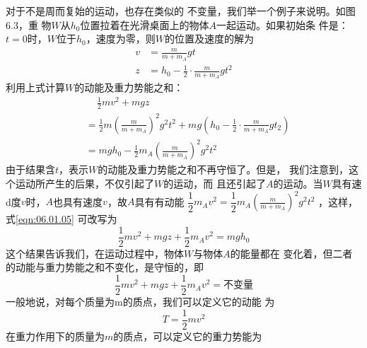 对于不是周而复始的运动，也存在类似的
不变量，我们举一个例子来说明。如图6.3，重
物$ W $从$ h _ { 0 } $位置拉着在光滑桌面上的物体$ A $一起运动。如果初始条
件是：$ t = 0 $时，$ W $位于$ h _ { 0 } $，速度为零，则$ W $的位置及速度的解为
\begin{equation*}
 \begin{aligned}
 v &= \frac { m } { m + m _ { A } } g t \\
 z &= h _ { 0 } - \frac { 1 } { 2 } \cdot \frac { m } { m + m _ { A } } g t ^ { 2 }
 \end{aligned}
\end{equation*}
利用上式计算$ W $的动能及重力势能之和：
{\setlength{\mathindent}{2em}
\begin{equation}\label{eqn:06.01.05}
 \begin{aligned}
 &\quad \, \frac { 1 } { 2 } m v ^ { 2 } + m g z \\
 &= \frac { 1 } { 2 } m \left( \frac { m } { m + m _ { A } } \right) ^ { 2 } g ^ { 2 } t ^ { 2 } + m g \left( h _ { 0 } - \frac { 1 } { 2 } \cdot \frac { m } { m + m _ { A } } g t _ { 2 } \right) \\
 &= m g h _ { 0 } - \frac { 1 } { 2 } m _ { A } \left( \frac { m } { m + m _ { A } } \right) ^ { 2 } g ^ { 2 } t ^ { 2 }
 \end{aligned}
\end{equation}}
由于结果含$ t $，表示$ W $的动能及重力势能之和不再守恒了。但是，
我们注意到，这个运动所产生的后果，不仅引起了$ W $的运动，而
且还引起了$ A $的运动。当$ W $具有速d度$ v $时，$ A $也具有速度$ v $，故$ A $具有有动能
$ \dfrac { 1 } { 2 } m _ { A } v ^ { 2 } = \dfrac { 1 } { 2 } m _ { A } \left( \frac { m } { m + m _ { A } } \right) ^ { 2 } g ^ { 2 } t ^ { 2 } $
，这样，式\eqref{eqn:06.01.05}
可改写为
\begin{equation*}
 \frac { 1 } { 2 } m v ^ { 2 } + m g z + \frac { 1 } { 2 } m _ { A } v ^ { 2 } = m g h _ { 0 }
\end{equation*}
这个结果告诉我们，在运动过程中，物体$ W $与物体$ A $的能量都在
变化着，但二者的动能与重力势能之和不变化，是守恒的，即
\begin{equation}\label{eqn:06.01.06}
 \frac { 1 } { 2 } m v ^ { 2 } + m g z + \frac { 1 } { 2 } m _ { A } v ^ { 2 } = \text{不变量}
\end{equation}
一般地说，对每个质量为m的质点，我们可以定义它的动能
为
\begin{equation*}
 T = \frac { 1 } { 2 } m v ^ { 2 }
\end{equation*}
在重力作用下的质量为$ m $的质点，可以定义它的重力势能为
